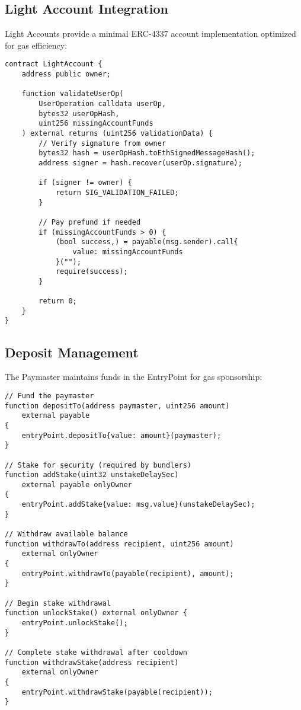 \documentclass[11pt,a4paper]{article}
\begin{document}
\subsection{Light Account Integration}

Light Accounts \cite{lightaccount} provide a minimal ERC-4337 account implementation optimized for gas efficiency:

\begin{lstlisting}[caption=Light Account Structure]
contract LightAccount {
    address public owner;

    function validateUserOp(
        UserOperation calldata userOp,
        bytes32 userOpHash,
        uint256 missingAccountFunds
    ) external returns (uint256 validationData) {
        // Verify signature from owner
        bytes32 hash = userOpHash.toEthSignedMessageHash();
        address signer = hash.recover(userOp.signature);

        if (signer != owner) {
            return SIG_VALIDATION_FAILED;
        }

        // Pay prefund if needed
        if (missingAccountFunds > 0) {
            (bool success,) = payable(msg.sender).call{
                value: missingAccountFunds
            }("");
            require(success);
        }

        return 0;
    }
}
\end{lstlisting}

\subsection{Deposit Management}

The Paymaster maintains funds in the EntryPoint for gas sponsorship:

\begin{lstlisting}[caption=Deposit Management]
// Fund the paymaster
function depositTo(address paymaster, uint256 amount)
    external payable
{
    entryPoint.depositTo{value: amount}(paymaster);
}

// Stake for security (required by bundlers)
function addStake(uint32 unstakeDelaySec)
    external payable onlyOwner
{
    entryPoint.addStake{value: msg.value}(unstakeDelaySec);
}

// Withdraw available balance
function withdrawTo(address recipient, uint256 amount)
    external onlyOwner
{
    entryPoint.withdrawTo(payable(recipient), amount);
}

// Begin stake withdrawal
function unlockStake() external onlyOwner {
    entryPoint.unlockStake();
}

// Complete stake withdrawal after cooldown
function withdrawStake(address recipient)
    external onlyOwner
{
    entryPoint.withdrawStake(payable(recipient));
}
\end{lstlisting}
\end{document}
